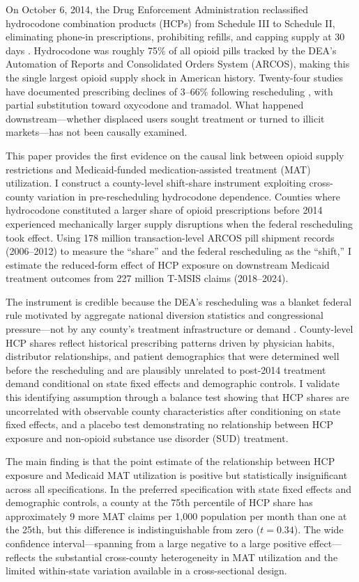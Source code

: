 \documentclass[12pt]{article}
\begin{document}
On October 6, 2014, the Drug Enforcement Administration reclassified hydrocodone combination products (HCPs) from Schedule III to Schedule II, eliminating phone-in prescriptions, prohibiting refills, and capping supply at 30 days \citep{jones2014hydrocodone}. Hydrocodone was roughly 75\% of all opioid pills tracked by the DEA's Automation of Reports and Consolidated Orders System (ARCOS), making this the single largest opioid supply shock in American history. Twenty-four studies have documented prescribing declines of 3--66\% following rescheduling \citep{jones2016hydrocodone, castlight2016rescheduling}, with partial substitution toward oxycodone and tramadol. What happened downstream---whether displaced users sought treatment or turned to illicit markets---has not been causally examined.

This paper provides the first evidence on the causal link between opioid supply restrictions and Medicaid-funded medication-assisted treatment (MAT) utilization. I construct a county-level shift-share instrument exploiting cross-county variation in pre-rescheduling hydrocodone dependence. Counties where hydrocodone constituted a larger share of opioid prescriptions before 2014 experienced mechanically larger supply disruptions when the federal rescheduling took effect. Using 178 million transaction-level ARCOS pill shipment records (2006--2012) to measure the ``share'' and the federal rescheduling as the ``shift,'' I estimate the reduced-form effect of HCP exposure on downstream Medicaid treatment outcomes from 227 million T-MSIS claims (2018--2024).

The instrument is credible because the DEA's rescheduling was a blanket federal rule motivated by aggregate national diversion statistics and congressional pressure---not by any county's treatment infrastructure or demand \citep{jones2014hydrocodone}. County-level HCP shares reflect historical prescribing patterns driven by physician habits, distributor relationships, and patient demographics that were determined well before the rescheduling and are plausibly unrelated to post-2014 treatment demand conditional on state fixed effects and demographic controls. I validate this identifying assumption through a balance test showing that HCP shares are uncorrelated with observable county characteristics after conditioning on state fixed effects, and a placebo test demonstrating no relationship between HCP exposure and non-opioid substance use disorder (SUD) treatment.

The main finding is that the point estimate of the relationship between HCP exposure and Medicaid MAT utilization is positive but statistically insignificant across all specifications. In the preferred specification with state fixed effects and demographic controls, a county at the 75th percentile of HCP share has approximately 9 more MAT claims per 1,000 population per month than one at the 25th, but this difference is indistinguishable from zero ($t = 0.34$). The wide confidence interval---spanning from a large negative to a large positive effect---reflects the substantial cross-county heterogeneity in MAT utilization and the limited within-state variation available in a cross-sectional design.
\end{document}
